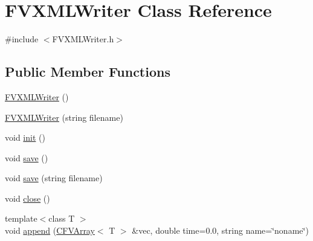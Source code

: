 \hypertarget{classFVL_1_1FVXMLWriter}{
\section{FVXMLWriter Class Reference}
\label{dc/d55/classFVL_1_1FVXMLWriter}
}


{\ttfamily \#include $<$FVXMLWriter.h$>$}

\subsection*{Public Member Functions}
\begin{DoxyCompactItemize}
\item 
\hyperlink{classFVL_1_1FVXMLWriter_a01431b55da626df7bf2a47d35e4b3172}{FVXMLWriter} ()
\item 
\hyperlink{classFVL_1_1FVXMLWriter_a60c39a6632640f8f2ff5d55d7d9b7b49}{FVXMLWriter} (string filename)
\item 
void \hyperlink{classFVL_1_1FVXMLWriter_a02fd73d861ef2e4aabb38c0c9ff82947}{init} ()
\item 
void \hyperlink{classFVL_1_1FVXMLWriter_aae2c382151ef7c9aa913361172b30db6}{save} ()
\item 
void \hyperlink{classFVL_1_1FVXMLWriter_a0c0bc9b887e8ae60cdef289ffed0e8cb}{save} (string filename)
\item 
void \hyperlink{classFVL_1_1FVXMLWriter_a5ae591df94fc66ccb85cbb6565368bca}{close} ()
\item 
{\footnotesize template$<$class T $>$ }\\void \hyperlink{classFVL_1_1FVXMLWriter_a2b15df402a7d0b3a050436cf98f192dd}{append} (\hyperlink{classFVL_1_1CFVArray}{CFVArray}$<$ T $>$ \&vec, double time=0.0, string name=\char`\"{}noname\char`\"{})
\end{DoxyCompactItemize}


